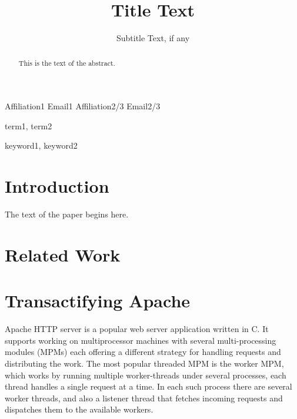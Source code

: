 \documentclass[preprint,natbib,11pt]{sigplanconf}
\begin{document}
\lstset{language=C}

\copyrightdata{[to be supplied]} 


\title{Title Text}
\subtitle{Subtitle Text, if any}

           {Affiliation1}
           {Email1}
           {Affiliation2/3}
           {Email2/3}

\maketitle

\begin{abstract}
This is the text of the abstract.
\end{abstract}


\terms
term1, term2

\keywords
keyword1, keyword2

\section{Introduction}

The text of the paper begins here.
\section{Related Work}
\section{Transactifying Apache}
Apache\cite{apache} HTTP server is a popular web server application written in C. It
supports working on multiprocessor machines with several multi-processing
modules (MPMs) each offering a different strategy for handling requests and
distributing the work. The most popular threaded MPM is the worker MPM, which
works by running multiple worker-threads under several processes, each thread
handles a single request at a time. In each such process there are several
worker threads, and also a listener thread that fetches incoming requests and
dispatches them to the available workers.
\end{document}
